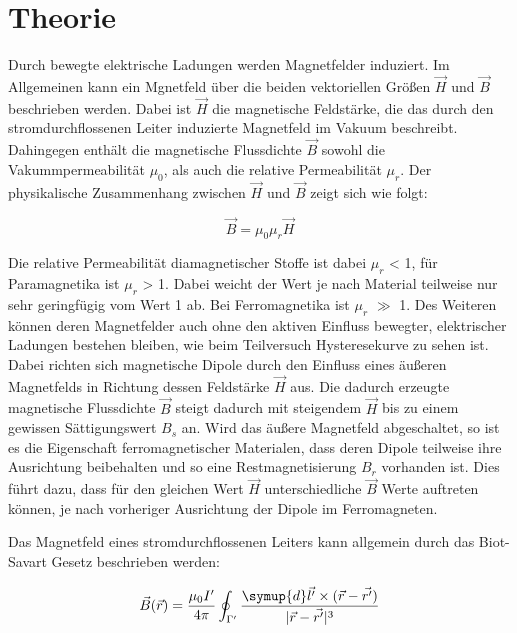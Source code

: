 \section{Theorie}
\label{sec:Theorie}





Durch bewegte elektrische Ladungen werden Magnetfelder induziert.
Im Allgemeinen kann ein Mgnetfeld über die beiden vektoriellen Größen 
$\vec H$ und $\vec B$ beschrieben werden. Dabei ist $\vec H$ die 
magnetische Feldstärke, die das durch den stromdurchflossenen Leiter induzierte 
Magnetfeld im Vakuum beschreibt. Dahingegen enthält die magnetische Flussdichte
$\vec B$ sowohl die Vakummpermeabilität $\mu_0$, als auch die relative Permeabilität
$\mu_r$. Der physikalische Zusammenhang zwischen $\vec H$ und $\vec B$ zeigt sich wie folgt:

\begin{equation}
    \vec B = \mu_0 \mu_r \vec H
\end{equation}

Die relative Permeabilität diamagnetischer Stoffe ist dabei $\mu_r$ < 1, für 
Paramagnetika ist $\mu_r$ > 1. Dabei weicht der Wert je nach Material teilweise 
nur sehr geringfügig vom Wert 1 ab. Bei Ferromagnetika ist $\mu_r$ $\gg$ 1. Des Weiteren
können deren Magnetfelder auch ohne den aktiven Einfluss bewegter, elektrischer Ladungen
bestehen bleiben, wie beim Teilversuch Hysteresekurve zu sehen ist. Dabei richten sich 
magnetische Dipole durch den Einfluss 
eines äußeren Magnetfelds in Richtung dessen Feldstärke $\vec H$ aus. Die dadurch erzeugte magnetische
Flussdichte $\vec B$ steigt dadurch mit steigendem $\vec H$ bis zu einem gewissen Sättigungswert $B_s$
an. Wird das äußere Magnetfeld abgeschaltet, so ist es die Eigenschaft ferromagnetischer Materialen, dass
deren Dipole teilweise ihre Ausrichtung beibehalten und so eine Restmagnetisierung $B_r$ vorhanden ist.
Dies führt dazu, dass für den gleichen Wert $\vec H$ unterschiedliche $\vec B$ Werte auftreten können, je 
nach vorheriger Ausrichtung der Dipole im Ferromagneten. 


Das Magnetfeld eines stromdurchflossenen Leiters kann allgemein durch das Biot-Savart Gesetz
beschrieben werden:

\begin{equation}
    \vec{B}(\vec r) = \frac{\mu_0 I'}{4\pi} \oint_{\Gamma'} \frac{\symup{d}\vec{l'}\times (\vec{r}-\vec{r'})}{\lvert\vec{r}-\vec{r'}\rvert^3}
\end{equation}

